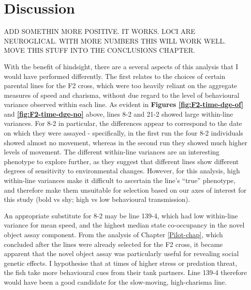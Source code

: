 \documentclass[
]{book}
\begin{document}
\hypertarget{discussion-1}{%
\section{Discussion}\label{discussion-1}}

ADD SOMETHIN MORE POSITIVE. IT WORKS. LOCI ARE NEUROGLICAL. WITH MORE NUMBERS THIS WILL WORK WELL. MOVE THIS STUFF INTO THE CONCLUSIONS CHAPTER.

With the benefit of hindsight, there are a several aspects of this analysis that I would have performed differently. The first relates to the choices of certain parental lines for the F2 cross, which were too heavily reliant on the aggregate measures of speed and charisma, without due regard to the level of behavioural variance observed within each line. As evident in \textbf{Figures \ref{fig:F2-time-dge-of}} and \textbf{\ref{fig:F2-time-dge-no}} above, lines \textcolor{8-2_FF699C}{8-2} and \textcolor{21-2_49B500}{21-2} showed large within-line variances. For \textcolor{8-2_FF699C}{8-2} in particular, the differences appear to correspond to the date on which they were assayed - specifically, in the first run the four \textcolor{8-2_FF699C}{8-2} individuals showed almost no movement, whereas in the second run they showed much higher levels of movement. The different within-line variances are an interesting phenotype to explore further, as they suggest that different lines show different degrees of sensitivity to environmental changes. However, for this analysis, high within-line variances make it difficult to ascertain the line's ``true'' phenotype, and therefore make them unsuitable for selection based on our axes of interest for this study (bold vs shy; high vs low behavioural transmission).

An appropriate substitute for \textcolor{8-2_FF699C}{8-2} may be line \textcolor{139-4_FF61CC}{139-4}, which had low within-line variance for mean speed, and the highest median state co-occupancy in the novel object assay component. From the analysis of Chapter \ref{Pilot-chap}, which concluded after the lines were already selected for the F2 cross, it became apparent that the novel object assay was particularly useful for revealing social genetic effects. I hypothesise that at times of higher stress or predation threat, the fish take more behavioural cues from their tank partners. Line \textcolor{139-4_FF61CC}{139-4} therefore would have been a good candidate for the slow-moving, high-charisma line.
\end{document}
